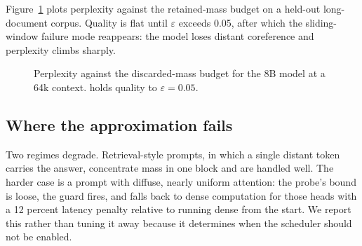 Figure~\ref{fig:quality} plots perplexity against the retained-mass budget on a
held-out long-document corpus. Quality is flat until $\varepsilon$ exceeds
0.05, after which the sliding-window failure mode reappears: the model loses
distant coreference and perplexity climbs sharply.

\begin{figure}[t]
  \centering
  \caption{Perplexity against the discarded-mass budget for the 8B model at a
  64k context. \sysname{} holds quality to $\varepsilon = 0.05$.}
  \label{fig:quality}
\end{figure}

\subsection{Where the approximation fails}

Two regimes degrade. Retrieval-style prompts, in which a single distant token
carries the answer, concentrate mass in one block and are handled well. The
harder case is a prompt with diffuse, nearly uniform attention: the probe's
bound is loose, the guard fires, and \sysname{} falls back to dense
computation for those heads with a 12 percent latency penalty relative to
running dense from the start. We report this rather than tuning it away
because it determines when the scheduler should not be enabled.

